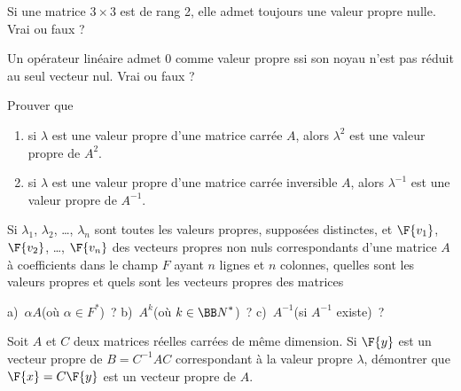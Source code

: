 \documentclass[12pt,french,oneside,a4paper]{memoir} %
\begin{document}
\begin{exo}
Si une matrice $3 \times 3$ est de rang 2, elle admet toujours une valeur 
propre nulle. Vrai ou faux ?
\end{exo}

\begin{exo}
Un opérateur linéaire admet $0$ comme valeur propre ssi son noyau n'est pas réduit au seul vecteur nul. Vrai ou faux 
?
\end{exo}

\begin{exo}
Prouver que 
\begin{enumerate}
\item si $\lambda$ est une valeur propre d'une matrice carrée $A$, alors 
$\lambda^2$ est une valeur propre de $A^2$. 
\item si $\lambda$ est une valeur propre d'une matrice carrée inversible $A$, 
alors $\lambda^{-1}$ est une valeur propre de $A^{-1}$. 
\end{enumerate}
\end{exo}
\begin{exo}
Si $\lambda_1$, $\lambda_2$, \dots, $\lambda_n$ sont toutes les valeurs propres, 
supposées distinctes, et $\F{\mathstrut{v_1}}$, $\F{\mathstrut{v_2}}$, \dots, $\F{\mathstrut{v_n}}$ des vecteurs propres non nuls correspondants d'une matrice $A$ à coefficients dans le champ $F$ ayant $n$ lignes et $n$ colonnes, quelles sont les valeurs propres et quels sont les vecteurs propres des matrices
\begin{center}
\hfill a)~$\alpha A$\quad (où $\alpha \in F^*$)~?
\hfill b)~$A^k$\quad (où $k \in {\BB N}^*$)~?
\hfill c)~$A^{-1}$\quad (si $A^{-1}$ existe)~?\hfill~
\end{center}
\end{exo}
\begin{exo}
Soit $A$ et $C$ deux matrices réelles carrées de même dimension. 
Si $\F{\mathstrut{y}}$ est un vecteur propre de $B=C^{-1}AC$ correspondant à la valeur 
propre $\lambda$, démontrer que $\F{\mathstrut{x}}=C \F{\mathstrut{y}}$ est un vecteur propre de $A$.
\end{exo}
\end{document}
